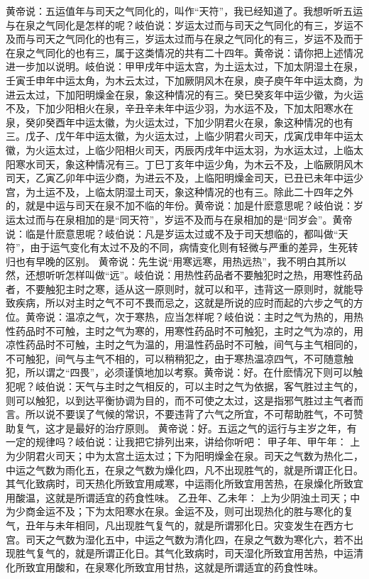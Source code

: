 \documentclass[12pt,UTF8]{ctexbook}
\begin{document}
黄帝说：五运值年与司天之气同化的，叫作“天符”，我已经知道了。我想听听五运与在泉之气同化是怎样的呢？岐伯说：岁运太过而与司天之气同化的有三，岁运不及而与司天之气同化的也有三，岁运太过而与在泉之气同化的有三，岁运不及而于在泉之气同化的也有三，属于这类情况的共有二十四年。黄帝说：请你把上述情况进一步加以说明。岐伯说：甲甲戌年中运太宫，为土运太过，下加太阴湿土在泉，壬寅壬申年中运太角，为木云太过，下加厥阴风木在泉，庾子庾午年中运太商，为进云太过，下加阳明燥金在泉，象这种情况的有三。癸巳癸亥年中运少徽，为火运不及，下加少阳相火在泉，辛丑辛未年中运少羽，为水运不及，下加太阳寒水在泉，癸卯癸酉年中运太徽，为火运太过，下加少阴君火在泉，象这种情况的也有三。戊子、戊午年中运太徽，为火运太过，上临少阴君火司天，戊寅戊申年中运太徽，为火运太过，上临少阳相火司天，丙辰丙戌年中运太羽，为水运太过，上临太阳寒水司天，象这种情况有三。丁巳丁亥年中运少角，为木云不及，上临厥阴风木司天，乙寅乙卯年中运少商，为进云不及，上临阳明燥金司天，已丑已未年中运少宫，为土运不及，上临太阴湿土司天，象这种情况的也有三。除此二十四年之外的，就是中运与司天在泉不加不临的年份。黄帝说：加是什麽意思呢？岐伯说：岁运太过而与在泉相加的是“同天符”，岁运不及而与在泉相加的是“同岁会”。黄帝说：临是什麽意思呢？岐伯说：凡是岁运太过或不及于司天想临的，都叫做“天符”，由于运气变化有太过不及的不同，病情变化则有轻微与严重的差异，生死转归也有早晚的区别。
黄帝说：先生说“用寒远寒，用热远热”，我不明白其所以然，还想听听怎样叫做“远”。岐伯说：用热性药品者不要触犯时之热，用寒性药品者，不要触犯主时之寒，适从这一原则时，就可以和平，违背这一原则时，就能导致疾病，所以对主时之气不可不畏而忌之，这就是所说的应时而起的六步之气的方位。黄帝说：温凉之气，次于寒热，应当怎样呢？岐伯说：主时之气为热的，用热性药品时不可触，主时之气为寒的，用寒性药品时不可触犯，主时之气为凉的，用凉性药品时不可触，主时之气为温的，用温性药品时不可触，间气与主气相同的，不可触犯，间气与主气不相的，可以稍稍犯之，由于寒热温凉四气，不可随意触犯，所以谓之“四畏”，必须谨慎地加以考察。黄帝说：好。在什麽情况下则可以触犯呢？岐伯说：天气与主时之气相反的，可以主时之气为依据，客气胜过主气的，则可以触犯，以到达平衡协调为目的，而不可使之太过，这是指邪气胜过主气者而言。所以说不要误了气候的常识，不要违背了六气之所宜，不可帮助胜气，不可赞助复气，这才是最好的治疗原则。
黄帝说：好。五运之气的运行与主岁之年，有一定的规律吗？岐伯说：让我把它排列出来，讲给你听吧：
甲子年、甲午年：
上为少阴君火司天；中为太宫土运太过；下为阳明燥金在泉。司天之气数为热化二，中运之气数为雨化五，在泉之气数为燥化四，凡不出现胜气的，就是所谓正化日。其气化致病时，司天热化所致宜用咸寒，中运雨化所致宜用苦热，在泉燥化所致宜用酸温，这就是所谓适宜的药食性味。
乙丑年、乙未年：
上为少阴浊土司天；中为少商金运不及；下为太阳寒水在泉。金运不及，则可出现热化的胜与寒化的复气，丑年与未年相同，凡出现胜气复气的，就是所谓邪化日。灾变发生在西方七宫。司天之气数为湿化五中，中运之气数为清化四，在泉之气数为寒化六，若不出现胜气复气的，就是所谓正化日。其气化致病时，司天湿化所致宜用苦热，中运清化所致宜用酸和，在泉寒化所致宜用甘热，这就是所谓适宜的药食性味。
\end{document}
